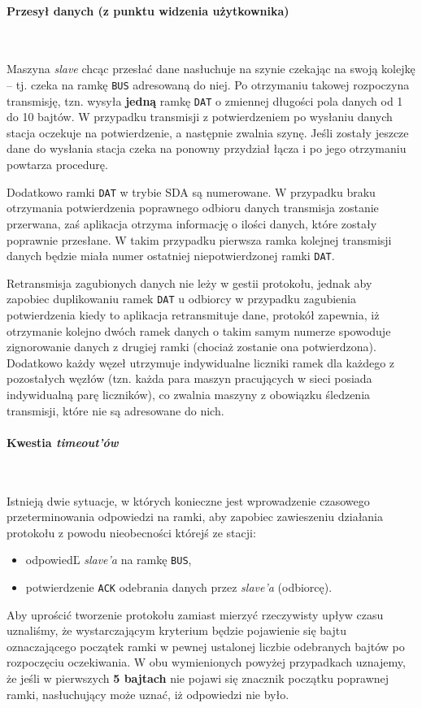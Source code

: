 \documentclass[a4paper,12pt]{article}
\begin{document}
\paragraph{Przesył danych (z punktu widzenia użytkownika)}\

Maszyna \emph{slave} chcąc przesłać dane nasłuchuje na szynie czekając na
swoją kolejkę -- tj. czeka na ramkę \texttt{BUS} adresowaną do niej. Po
otrzymaniu takowej rozpoczyna transmisję, tzn. wysyła \textbf{jedną} ramkę
\texttt{DAT} o zmiennej długości pola danych od 1 do 10 bajtów. W przypadku
transmisji z potwierdzeniem po wysłaniu danych stacja oczekuje na
potwierdzenie, a następnie zwalnia szynę. Jeśli zostały jeszcze dane do
wysłania stacja czeka na ponowny przydział łącza i po jego otrzymaniu powtarza
procedurę.

Dodatkowo ramki \texttt{DAT} w trybie SDA są numerowane. W przypadku braku
otrzymania potwierdzenia poprawnego odbioru danych transmisja zostanie
przerwana, zaś aplikacja otrzyma informację o ilości danych, które zostały
poprawnie przesłane. W takim przypadku pierwsza ramka kolejnej transmisji
danych będzie miała numer ostatniej niepotwierdzonej ramki \texttt{DAT}.

Retransmisja zagubionych danych nie leży w gestii protokołu, jednak aby
zapobiec duplikowaniu ramek \texttt{DAT} u odbiorcy w przypadku zagubienia
potwierdzenia kiedy to aplikacja retransmituje dane, protokół zapewnia, iż
otrzymanie kolejno dwóch ramek danych o takim samym numerze spowoduje
zignorowanie danych z drugiej ramki (chociaż zostanie ona potwierdzona).
Dodatkowo każdy węzeł utrzymuje indywidualne liczniki ramek dla każdego z
pozostałych węzłów (tzn. każda para maszyn pracujących w sieci posiada
indywidualną parę liczników), co zwalnia maszyny z obowiązku śledzenia
transmisji, które nie są adresowane do nich.

\paragraph{Kwestia \emph{timeout'ów}}\

Istnieją dwie sytuacje, w których konieczne jest wprowadzenie czasowego
przeterminowania odpowiedzi na ramki, aby zapobiec zawieszeniu działania
protokołu z powodu nieobecności którejś ze stacji:
\begin{itemize}
  \item odpowiedĽ \emph{slave'a} na ramkę \texttt{BUS},
  \item potwierdzenie \texttt{ACK} odebrania danych przez \emph{slave'a}
        (odbiorcę).
\end{itemize}
Aby uprościć tworzenie protokołu zamiast mierzyć rzeczywisty upływ czasu
uznaliśmy, że wystarczającym kryterium będzie pojawienie się bajtu
oznaczającego początek ramki w pewnej ustalonej liczbie odebranych bajtów po
rozpoczęciu oczekiwania. W obu wymienionych powyżej przypadkach uznajemy, że
jeśli w pierwszych \textbf{5 bajtach} nie pojawi się znacznik początku
poprawnej ramki, nasłuchujący może uznać, iż odpowiedzi nie było.
\end{document}
